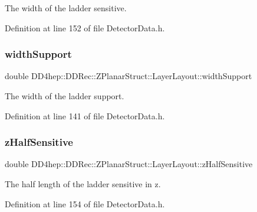 The width of the ladder sensitive. 



Definition at line 152 of file Detector\+Data.\+h.

\hypertarget{struct_d_d4hep_1_1_d_d_rec_1_1_z_planar_struct_1_1_layer_layout_a424a9c4bbadfd8837f8f470ae48b2c61}{}\label{struct_d_d4hep_1_1_d_d_rec_1_1_z_planar_struct_1_1_layer_layout_a424a9c4bbadfd8837f8f470ae48b2c61} 
\subsubsection{\texorpdfstring{width\+Support}{widthSupport}}
{\footnotesize\ttfamily double D\+D4hep\+::\+D\+D\+Rec\+::\+Z\+Planar\+Struct\+::\+Layer\+Layout\+::width\+Support}



The width of the ladder support. 



Definition at line 141 of file Detector\+Data.\+h.

\hypertarget{struct_d_d4hep_1_1_d_d_rec_1_1_z_planar_struct_1_1_layer_layout_ae8c448242045e1e213990a74150b5df7}{}\label{struct_d_d4hep_1_1_d_d_rec_1_1_z_planar_struct_1_1_layer_layout_ae8c448242045e1e213990a74150b5df7} 
\subsubsection{\texorpdfstring{z\+Half\+Sensitive}{zHalfSensitive}}
{\footnotesize\ttfamily double D\+D4hep\+::\+D\+D\+Rec\+::\+Z\+Planar\+Struct\+::\+Layer\+Layout\+::z\+Half\+Sensitive}



The half length of the ladder sensitive in z. 



Definition at line 154 of file Detector\+Data.\+h.

